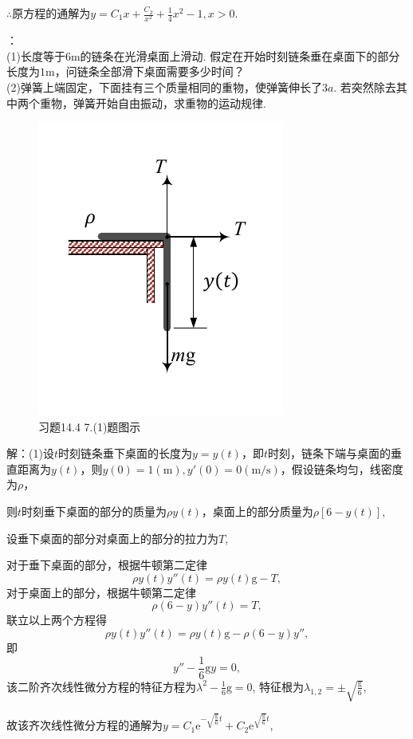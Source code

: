 \documentclass[12pt,UTF8,fleqn]{ctexart}
\newcommand{\me}[0]{\mathrm e}
\begin{document}
\begin{enumerate}
$\therefore$原方程的通解为$y=C_1x+\frac{C_2}{x^2}+\frac14x^2-1,x>0$.

：\\
(1)长度等于$6\text{m}$的链条在光滑桌面上滑动. 假定在开始时刻链条垂在桌面下的部分长度为$1\text{m}$，问链条全部滑下桌面需要多少时间？\\
(2)弹簧上端固定，下面挂有三个质量相同的重物，使弹簧伸长了$3a$. 若突然除去其中两个重物，弹簧开始自由振动，求重物的运动规律.

\begin{figure}[H]
\begin{center}
\includegraphics[height=0.5\textheight]{Figures27/14-4-7-2.pdf}
\end{center}
\caption{习题14.4 7.(1)题图示}
\end{figure}

解：(1)设$t$时刻链条垂下桌面的长度为$y=y(t)$，即$t$时刻，链条下端与桌面的垂直距离为$y(t)$，则$y(0)=1(\text{m}),y'(0)=0(\text{m/s})$，假设链条均匀，线密度为$\rho$，

则$t$时刻垂下桌面的部分的质量为$\rho y(t)$，桌面上的部分质量为$\rho[6-y(t)]$,

设垂下桌面的部分对桌面上的部分的拉力为$T$,

对于垂下桌面的部分，根据牛顿第二定律
\[\rho y(t)y''(t)=\rho y(t)\text{g}-T,\]
对于桌面上的部分，根据牛顿第二定律
\[\rho(6-y)y''(t)=T,\]
联立以上两个方程得
\[\rho y(t)y''(t)=\rho y(t)\text{g}-\rho(6-y)y'',\]
即
\[y''-\frac16\text{g}y=0,\]
该二阶齐次线性微分方程的特征方程为$\lambda^2-\frac16\text{g}=0$, 特征根为$\lambda_{1,2}=\pm\sqrt{\frac{\text{g}}6}$,

故该齐次线性微分方程的通解为$y=C_1\me^{-\sqrt{\frac{\text{g}}6}t}+C_2\me^{\sqrt{\frac{\text{g}}6}t}$,


\end{enumerate}
\end{document}
